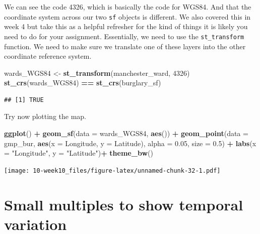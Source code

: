 \documentclass[]{book}
\newenvironment{Shaded}{\begin{snugshade}}{\end{snugshade}}
\newcommand{\DataTypeTok}[1]{\textcolor[rgb]{0.13,0.29,0.53}{#1}}
\newcommand{\DecValTok}[1]{\textcolor[rgb]{0.00,0.00,0.81}{#1}}
\newcommand{\FloatTok}[1]{\textcolor[rgb]{0.00,0.00,0.81}{#1}}
\newcommand{\KeywordTok}[1]{\textcolor[rgb]{0.13,0.29,0.53}{\textbf{#1}}}
\newcommand{\NormalTok}[1]{#1}
\newcommand{\OperatorTok}[1]{\textcolor[rgb]{0.81,0.36,0.00}{\textbf{#1}}}
\newcommand{\StringTok}[1]{\textcolor[rgb]{0.31,0.60,0.02}{#1}}
\begin{document}
We can see the code 4326, which is basically the code for WGS84. And that the coordinate system across our two \texttt{sf} objects is different. We also covered this in week 4 but take this as a helpful refresher for the kind of things it is likely you need to do for your assignment. Essentially, we need to use the \texttt{st\_transform} function. We need to make sure we translate one of these layers into the other coordinate reference system.

\begin{Shaded}
\begin{Highlighting}[]
\NormalTok{wards_WGS84 <-}\StringTok{ }\KeywordTok{st_transform}\NormalTok{(manchester_ward, }\DecValTok{4326}\NormalTok{)}
\KeywordTok{st_crs}\NormalTok{(wards_WGS84) }\OperatorTok{==}\StringTok{ }\KeywordTok{st_crs}\NormalTok{(burglary_sf)}
\end{Highlighting}
\end{Shaded}

\begin{verbatim}
## [1] TRUE
\end{verbatim}

Try now plotting the map.

\begin{Shaded}
\begin{Highlighting}[]
\KeywordTok{ggplot}\NormalTok{() }\OperatorTok{+}\StringTok{ }\KeywordTok{geom_sf}\NormalTok{(}\DataTypeTok{data =}\NormalTok{ wards_WGS84, }\KeywordTok{aes}\NormalTok{()) }\OperatorTok{+}\StringTok{ }
\StringTok{  }\KeywordTok{geom_point}\NormalTok{(}\DataTypeTok{data =}\NormalTok{ gmp_bur, }\KeywordTok{aes}\NormalTok{(}\DataTypeTok{x =}\NormalTok{ Longitude, }\DataTypeTok{y =}\NormalTok{ Latitude),}
             \DataTypeTok{alpha =} \FloatTok{0.05}\NormalTok{, }\DataTypeTok{size =} \FloatTok{0.5}\NormalTok{) }\OperatorTok{+}\StringTok{ }
\StringTok{  }\KeywordTok{labs}\NormalTok{(}\DataTypeTok{x =} \StringTok{"Longitude"}\NormalTok{, }\DataTypeTok{y =} \StringTok{"Latitude"}\NormalTok{)}\OperatorTok{+}
\StringTok{  }\KeywordTok{theme_bw}\NormalTok{()}
\end{Highlighting}
\end{Shaded}

\texttt{[image: 10-week10\_files/figure-latex/unnamed-chunk-32-1.pdf]}

\hypertarget{small-multiples-to-show-temporal-variation}{%
\section{Small multiples to show temporal variation}\label{small-multiples-to-show-temporal-variation}}
\end{document}
